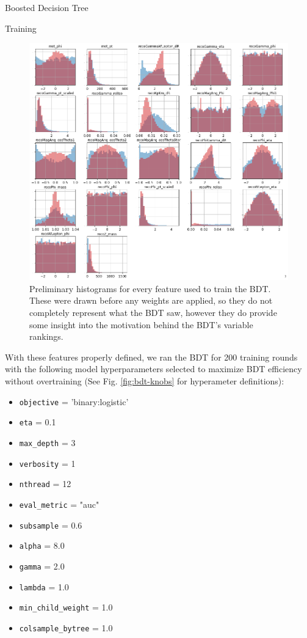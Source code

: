 \begin{section}{Boosted Decision Tree}
\begin{subsection}{Training}
\begin{figure}[htb]
\begin{center}
\includegraphics[width=.95\linewidth]{Dissertation/fig/bdt-training.png}
\end{center}
\caption{Preliminary histograms for every feature used to train the BDT. These were drawn before any weights are applied, so they do not completely represent what the BDT saw, however they do provide some insight into the motivation behind the BDT's variable rankings.}
\label{fig:bdt-training}
\end{figure}

With these features properly defined, we ran the BDT for 200 training rounds with the following model hyperparameters selected to maximize BDT efficiency without overtraining (See Fig. \ref{fig:bdt-knobs} for hyperameter definitions):
\begin{itemize}
    \item \verb|objective| = 'binary:logistic'
    \item \verb|eta| = 0.1
    \item \verb|max_depth| = 3
    \item \verb|verbosity| = 1
    \item \verb|nthread| = 12
    \item \verb|eval_metric| = "auc"
    \item \verb|subsample| = 0.6
    \item \verb|alpha| = 8.0
    \item \verb|gamma| = 2.0
    \item \verb|lambda| = 1.0
    \item \verb|min_child_weight| = 1.0
    \item \verb|colsample_bytree| = 1.0
\end{itemize}


\end{subsection}
\end{section}

